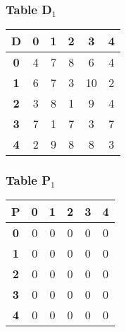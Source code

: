 \begin{frame}
\frametitle{Table D$_{1}$}
\begin{center}
    \begin{tabular}{|c||c|c|c|c|c|}
        \hline
        \textbf{D} & \textbf{0} & \textbf{1} & \textbf{2} & \textbf{3} & \textbf{4} \\
        \hline
        \hline
        \textbf{0}& 4 & 7 & 8 & 6 & 4 \\
        \hline
        \textbf{1}& 6 & 7 & 3 & 10 & 2 \\
        \hline
        \textbf{2}& 3 & 8 & 1 & \cellcolor{yellow}9 & 4 \\
        \hline
        \textbf{3}& 7 & 1 & 7 & 3 & 7 \\
        \hline
        \textbf{4}& 2 & 9 & 8 & \cellcolor{yellow}8 & 3 \\
        \hline
    \end{tabular}
\end{center}


\end{frame}


\begin{frame}
\frametitle{Table P$_{1}$}
\begin{center}
    \begin{tabular}{|c||c|c|c|c|c|}
        \hline
        \textbf{P} & \textbf{0} & \textbf{1} & \textbf{2} & \textbf{3} & \textbf{4} \\
        \hline
        \hline
        \textbf{0}& 0 & 0 & 0 & 0 & 0 \\
        \hline
        \textbf{1}& 0 & 0 & 0 & 0 & 0 \\
        \hline
        \textbf{2}& 0 & 0 & 0 & \cellcolor{yellow}0 & 0 \\
        \hline
        \textbf{3}& 0 & 0 & 0 & 0 & 0 \\
        \hline
        \textbf{4}& 0 & 0 & 0 & \cellcolor{yellow}0 & 0 \\
        \hline
    \end{tabular}
\end{center}


\end{frame}


